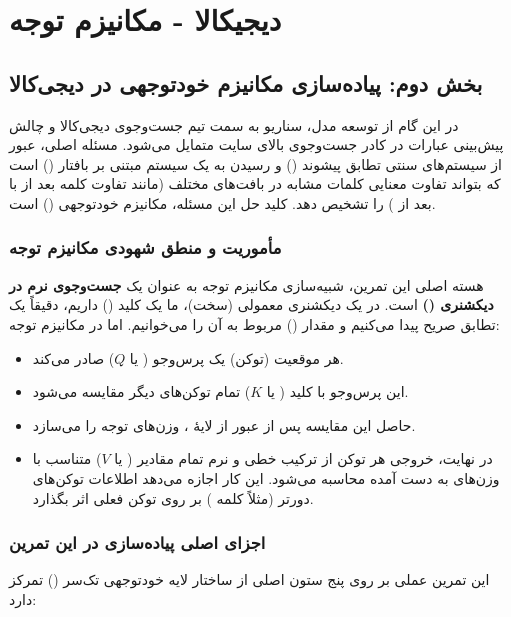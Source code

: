 \documentclass{article}
\begin{document}
\section{دیجیکالا - مکانیزم توجه}

\subsection{بخش دوم: پیاده‌سازی مکانیزم خود‌توجهی  در دیجی‌کالا}

در این گام از توسعه مدل، سناریو به سمت تیم جست‌وجوی دیجی‌کالا و چالش پیش‌بینی عبارات در کادر جست‌وجوی بالای سایت متمایل می‌شود. مسئله اصلی، عبور از سیستم‌های سنتی تطابق پیشوند () و رسیدن به یک سیستم مبتنی بر بافتار () است که بتواند تفاوت معنایی کلمات مشابه در بافت‌های مختلف (مانند تفاوت کلمه  بعد از  با بعد از ) را تشخیص دهد. کلید حل این مسئله، مکانیزم خود‌توجهی () است.

\subsubsection*{مأموریت و منطق شهودی مکانیزم توجه }
هسته اصلی این تمرین، شبیه‌سازی مکانیزم توجه به عنوان یک \textbf{جست‌وجوی نرم در دیکشنری ()} است. 
در یک دیکشنری معمولی (سخت)، ما یک کلید () داریم، دقیقاً یک تطابق صریح پیدا می‌کنیم و مقدار () مربوط به آن را می‌خوانیم. اما در مکانیزم توجه:
\begin{itemize}
	\item هر موقعیت (توکن) یک پرس‌وجو ( یا $Q$) صادر می‌کند.
	\item این پرس‌وجو با کلید ( یا $K$) تمام توکن‌های دیگر مقایسه می‌شود.
	\item حاصل این مقایسه پس از عبور از لایۀ ، وزن‌های توجه را می‌سازد.
	\item در نهایت، خروجی هر توکن از ترکیب خطی و نرم تمام مقادیر ( یا $V$) متناسب با وزن‌های به دست آمده محاسبه می‌شود. این کار اجازه می‌دهد اطلاعات توکن‌های دورتر (مثلاً کلمه ) بر روی توکن فعلی اثر بگذارد.
\end{itemize}

\subsubsection*{اجزای اصلی پیاده‌سازی در این تمرین}
این تمرین عملی بر روی پنج ستون اصلی از ساختار لایه خود‌توجهی تک‌سر () تمرکز دارد:
\end{document}
